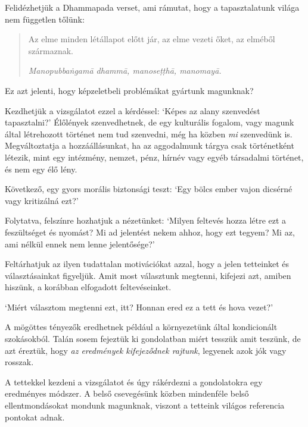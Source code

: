 
\noindent Felidézhetjük a Dhammapada verset, ami rámutat, hogy a
tapasztalatunk világa nem független tőlünk:

\begin{quote}
Az elme minden létállapot előtt jár, az elme vezeti őket, az elméből
származnak.

\emph{Manopubbaṅgamā dhammā, manoseṭṭhā, manomayā.}

\bigskip

\end{quote}

Ez azt jelenti, hogy képzeletbeli problémákat gyártunk magunknak?

Kezdhetjük a vizsgálatot ezzel a kérdéssel: `Képes az alany szenvedést
tapasztalni?' Élőlények szenvedhetnek, de egy kulturális fogalom, vagy
magunk által létrehozott történet nem tud szenvedni, még ha közben
\emph{mi} szenvedünk is. Megváltoztatja a hozzáállásunkat, ha az
aggodalmunk tárgya csak történetként létezik, mint egy intézmény,
nemzet, pénz, hírnév vagy egyéb társadalmi történet, és nem egy élő
lény.

Következő, egy gyors morális biztonsági teszt: `Egy bölcs ember vajon
dicsérné vagy kritizálná ezt?'

Folytatva, felszínre hozhatjuk a nézetünket: `Milyen feltevés hozza
létre ezt a feszültséget és nyomást? Mi ad jelentést nekem ahhoz, hogy
ezt tegyem? Mi az, ami nélkül ennek nem lenne jelentősége?'

Feltárhatjuk az ilyen tudattalan motivációkat azzal, hogy a jelen
tetteinket és választásainkat figyeljük. Amit most választunk megtenni,
kifejezi azt, amiben hiszünk, a korábban elfogadott feltevéseinket.

`Miért választom megtenni ezt, itt? Honnan ered ez a tett és hova
vezet?'

A mögöttes tényezők eredhetnek például a környezetünk által kondicionált
szokásokból. Talán sosem fejeztük ki gondolatban miért tesszük amit
teszünk, de azt éreztük, hogy \emph{az eredmények kifejeződnek rajtunk},
legyenek azok jók vagy rosszak.

A tettekkel kezdeni a vizsgálatot és úgy rákérdezni a gondolatokra egy
eredményes módszer. A belső csevegésünk közben mindenféle belső
ellentmondásokat mondunk magunknak, viszont a tetteink világos
referencia pontokat adnak.

